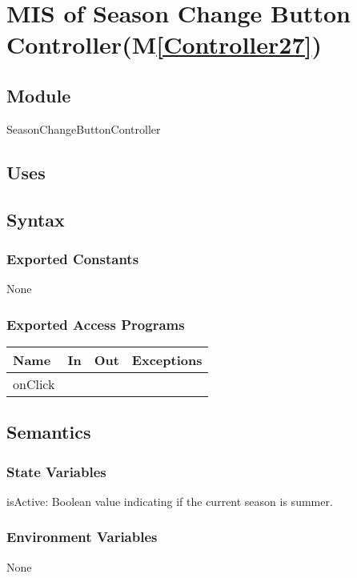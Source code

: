 \documentclass[12pt, titlepage]{article}
\newcommand{\mref}[1]{M\ref{#1}}
\begin{document}

\newpage

\section{MIS of Season Change Button Controller(\mref{Controller27})}  

\subsection{Module}

SeasonChangeButtonController

\subsection{Uses}

\subsection{Syntax}
\subsubsection{Exported Constants}
None
\subsubsection{Exported Access Programs}

\begin{center}
\begin{tabular}{| l | l | l | p{5cm}|}
\hline
\textbf{Name} & \textbf{In} & \textbf{Out} & \textbf{Exceptions} \\
\hline
 onClick&  &  &  \\

\hline
\end{tabular}
\end{center}

\subsection{Semantics}

\subsubsection{State Variables}
isActive: Boolean value indicating if the current season is summer.

\subsubsection{Environment Variables}
None
\end{document}
